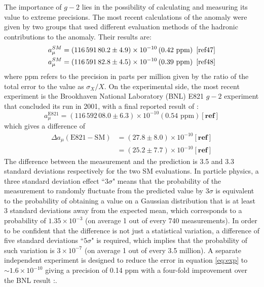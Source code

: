\documentclass{outhesis}
\begin{document}
The importance of $g-2$ lies in the possibility of calculating and measuring its value to extreme precisions. The most recent calculations of the anomaly were given by two groups that used different evaluation methods of the hadronic contributions to the anomaly. Their results are:
\begin{equation}
\begin{split}
& a_{\mu}^{SM} = \left(116\, 591\, 80.2 \pm 4.9\right) \times 10^{-10} \left(0.42  \text{ ppm}\right)  \,\,\cite{ref47}\\
& a_{\mu}^{SM} = \left(116\, 591\, 82.8 \pm 4.5\right) \times 10^{-10} \left(0.39  \text{ ppm}\right)  \,\,\cite{ref48}
\end{split}
\end{equation}
where ppm refers to the precision in parts per million given by the ratio of the total error to the value as $\sigma_X/X$. 
On the experimental side, the most recent experiment is the Brookhaven National Laboratory (BNL) E821 $g-2$ experiment that concluded its run in 2001, with a final reported result of \cite{bnl}:
\begin{equation}
a_{\mu}^{\text{E821}} = \left(116\, 592\, 08.0 \pm 6.3\right) \times 10^{-10} \left(0.54  \text{ ppm}\right) [\textbf{ref}]
\label{eq:exp}
\end{equation}
which gives a difference of 
\begin{equation}
\begin{split}
\Delta a_{\mu} \left(\text{E821} - \text{SM} \right) & = \left(27.8 \pm 8.0\right) \times 10^{-10}  [\textbf{ref}]\\
 & = \left(25.2 \pm 7.7\right) \times 10^{-10}  [\textbf{ref}]
\label{eq:diff}
\end{split}
\end{equation}
The difference between the measurement and the prediction is 3.5 and 3.3 standard deviations respectively for the two SM evaluations. In particle physics, a three standard deviation effect ``$3\sigma$" means that the probability of the measurement to randomly fluctuate from the predicted value by $3\sigma$ is equivalent to the probability of obtaining a value on a Gaussian distribution that is at least 3 standard deviations away from the expected mean, which corresponds to a probability of $1.35 \times 10^{-3}$ (on average 1 out of every 740 measurements). In order to be confident that the difference is not just a statistical variation, a difference of five standard deviations ``$5\sigma$" is required, which implies that the probability of such variation is $3 \times 10^{-7}$ (on average 1 out of every 3.5 million).  A separate independent experiment is designed to reduce the error in equation \ref{eq:exp} to $\sim 1.6 \times 10^{-10}$ giving a precision of 0.14 ppm with a four-fold improvement over the BNL result \cite{bnl}:.
\end{document}
